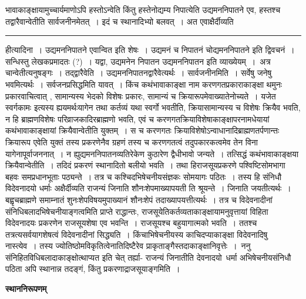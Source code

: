 \documentclass[11pt, openany]{book}
\begin{document}
\fancyhead[RE]{[कथंभावाकाङ्क्षा ]}
{\bl\noindent भावाकाङ्क्षायामुच्चार्यमाणोऽपि हस्तोऽन्वेति किंतु हस्तेनोद्यम्य निपात्येति उद्यमननिपातने एव, हस्तश्च तद्वारैवान्वेतीति सार्वजनीनमेतत्~। इदं च स्थानादिभ्यो बलवत्~। अत एवाक्षैर्दीव्यति }\\
\hrule
\vspace{3mm}
\noindent
{\br हीत्यादिना~।} उद्यमननिपातने एवान्वित इति शेषः~। उद्यमनं च निपातनं चोद्यमननिपातने इति द्विवचनं~। {\br सन्धिस्तु लेखकप्रमादतः (?)~।} यद्वा, {\qt उद्यमनेन निपातन उद्यमननिपातन इति व्याख्येयम्~}।~\noindent अत्र \textendash  चान्वेतीत्यनुषङ्गः~। {\br तद्द्वारैवेति~।} उद्यमननिपातनद्वारैवेत्यर्थः~। {\br सार्वजनीनमिति~।} सर्वेषु जनेषु भवमित्यर्थः~। सर्वजनप्रसिद्धमिति यावत्~। किंच कथंभावाकाङ्क्षा नाम करणगतप्रकाराकाङ्क्षा थमुनः प्रकारवाचित्वात् , सामान्यस्य भेदको विशेषः प्रकारः, सामान्यं च क्रियारूपमेवाख्यातेनोच्यते~। {\qt यजेत स्वर्गकामः} इत्यस्य ह्ययमर्थः\textendash यागेन तथा कर्तव्यं यथा स्वर्गो भवतीति, क्रियासामान्यस्य च विशेषः क्रियैव भवति, न हि ब्राह्मणविशेषः परिव्राजकादिरब्राह्मणो भवति, एवं च करणगतक्रियाविशेषाकाङ्क्षापरनामधेयायां कथंभावाकाङ्क्षायां क्रियैवान्वेतीति युक्तम्~। स च करणगतः क्रियाविशेषोऽन्वाधानादिब्राह्मणतर्पणान्तः क्रियारूप एवेति युक्तं तस्य प्रकरणेनैव ग्रहणं तस्य च करणगतत्वं तदुपकारकत्वमेव तेन विना यागेनापूर्वाजननात्~। न ह्युद्यमननिपातनव्यतिरेकेण कुठारेण द्वैधीभावो जन्यते~। तत्सिद्धं कथंभावाकाङ्क्षया क्रियैवान्वेतीति~। तदिदं प्रकरणं स्थानादितो बलीयो भवति~। तथा हि\textendash राजसूयप्रकरणे पश्विष्टिसोमभागा बहवः समप्रधानभूताः पठ्यन्ते~। तत्र च कश्चिदभिषेचनीयसंज्ञकः सोमयागः पठितः~। तस्य हि संनिधौ विदेवनादयो धर्माः {\qt अक्षैर्दीव्यति राजन्यं जिनाति शौनःशेपमाख्यापयती} ति श्रूयन्ते~। जिनाति जयतीत्यर्थः~। बह्वृचब्राह्मणे समाम्नातं शुनःशेपविषयमुपाख्यानं शौनःशेपं तदाख्यापयत्तीत्यर्थः~। तत्र च
विदेवनादीनां संनिधिबलादभिषेचनीयाङ्गत्वमिति प्राप्ते राद्धान्तः, राजसूयेतिकर्तव्यताकाङ्क्षायामनुवृत्तायां विहिता विदेवनादयः प्रकरणेन राजसूयशेषा एव भवन्ति~। राजसूयश्च बहुयागात्मको भवति~। ततश्च तत्रत्यसर्वयागशेषत्वं विदेवनादीनां सिद्ध्यति~। किंचाभिषेचनीयस्य काचिदप्याकाङ्क्षा विदेवनादिषु नास्त्येव~। तस्य ज्योतिष्ठोमविकृतित्वेनातिदिष्टैरेव प्राकृताङ्गैस्तदाकाङ्क्षानिवृत्तेः~।~{\br ननु} संनिहितविधिबलादाकाङ्क्षोत्थाप्यत इति चेत् तर्ह्या-
\newpage
\fancyhead[LO]{[पाठसादेश्येन विनि०]}
{\bl\noindent
राजन्यं जिनातीति देवनादयो\footnotemark\ धर्मा अभिषेचनीयसंनिधौ पठिता अपि स्थानान्न तदङ्गं, किंतु प्रकरणाद्राजसूयाङ्गमिति~।}
\begin{center}
\textbf{स्थाननिरूपणम्}    
\end{center}
\end{document}
